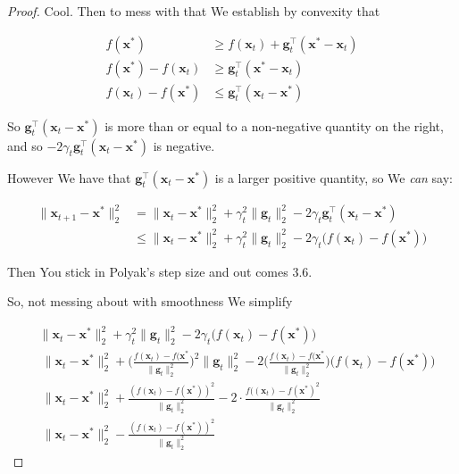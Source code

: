\documentclass{article}
\begin{document}
\begin{proof}
	Cool. Then to mess with that We establish by convexity that
	
	\begin{align}
		f(\mathbf{x}^*) &\ge f(\mathbf{x}_t) + \mathbf{g}_t^\top(\mathbf{x}^*-\mathbf{x}_t)\\
		f(\mathbf{x}^*) - f(\mathbf{x}_t)  &\ge  \mathbf{g}_t^\top(\mathbf{x}^*-\mathbf{x}_t)\\
		f(\mathbf{x}_t) - f(\mathbf{x}^*)   &\le  \mathbf{g}_t^\top(\mathbf{x}_t - \mathbf{x}^*)
	\end{align}
	
	So $\mathbf{g}_t^\top(\mathbf{x}_t - \mathbf{x}^*)$ is more than or equal to a non-negative quantity on the right, and so $- 2 \gamma_t\mathbf{g}^\top_t(\mathbf{x}_t - \mathbf{x}^*)$ is negative.
	
	However We have that $\mathbf{g}_t^\top(\mathbf{x}_t - \mathbf{x}^*)$ is a larger positive quantity, so We \textit{can} say:
	
	\begin{align}
		\|\mathbf{x}_{t+1} - \mathbf{x}^*\|^2_2 &= \|\mathbf{x}_t  - \mathbf{x}^* \|^2_2 + \gamma_t^2\|\mathbf{g}_t\|^2_2 - 2 \gamma_t\mathbf{g}^\top_t(\mathbf{x}_t - \mathbf{x}^*) \\
		&\le \|\mathbf{x}_t  - \mathbf{x}^* \|^2_2 + \gamma_t^2\|\mathbf{g}_t\|^2_2 - 2\gamma_t\big( f(\mathbf{x}_t) - f(\mathbf{x}^*) \big)
	\end{align}
	
	Then You stick in Polyak's step size and out comes 3.6. 
	
	So, not messing about with smoothness We simplify
	
	\begin{align}
		&\|\mathbf{x}_t  - \mathbf{x}^* \|^2_2 + \gamma_t^2\|\mathbf{g}_t\|^2_2 - 2 \gamma_t\big(f(\mathbf{x}_t) - f(\mathbf{x}^*)\big) \\
		&\ \|\mathbf{x}_t  - \mathbf{x}^* \|^2_2 +\bigg(\frac{f(\mathbf{x}_t)-f(\mathbf{x}^*}{\|\mathbf{g}_t\|^2_2} \bigg)^2\|\mathbf{g}_t\|^2_2 - 2\bigg(\frac{f(\mathbf{x}_t)-f(\mathbf{x}^*}{\|\mathbf{g}_t\|^2_2} \bigg)\big( f(\mathbf{x}_t) - f(\mathbf{x}^*)\big) \\
		&\ \|\mathbf{x}_t  - \mathbf{x}^* \|^2_2 +\frac{(f(\mathbf{x}_t)-f(\mathbf{x}^*))^2}{\|\mathbf{g}_t\|^2_2}  - 2\cdot\frac{f((\mathbf{x}_t)-f(\mathbf{x}^*)^2}{\|\mathbf{g}_t\|^2_2} \\
		&\ \|\mathbf{x}_t  - \mathbf{x}^* \|^2_2 - \frac{(f(\mathbf{x}_t)-f(\mathbf{x}^*))^2}{\|\mathbf{g}_t\|^2_2}  
	\end{align}
	

\end{proof}
\end{document}
